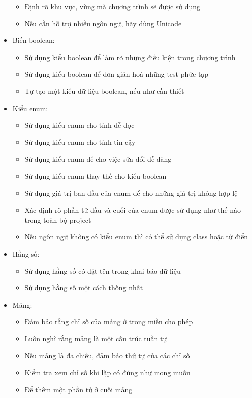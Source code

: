 \documentclass[12pt]{report}
\begin{document}
\begin{itemize}
\begin{itemize}
			\item Định rõ khu vực, vùng mà chương trình sẽ được sử dụng
			\item Nếu cần hỗ trợ nhiều ngôn ngữ, hãy dùng Unicode 
		\end{itemize}
	\item Biến boolean:
		\begin{itemize}
			\item Sử dụng kiểu boolean để làm rõ những điều kiện trong chương trình 
			\item Sử dụng kiểu boolean để đơn giản hoá những test phức tạp
			\item Tự tạo một kiểu dữ liệu boolean, nếu như cần thiết 
		\end{itemize}
	\item Kiểu enum:
		\begin{itemize}
			\item Sử dụng kiểu enum cho tính dễ đọc 
			\item Sử dụng kiểu enum cho tính tin cậy
			\item Sử dụng kiểu enum để cho việc sửa đổi dễ dàng 
			\item Sử dụng kiểu enum thay thế cho kiểu boolean 
			\item Sử dụng giá trị ban đầu của enum để cho những giá trị không hợp lệ
			\item Xác định rõ phần tử đầu và cuối của enum được sử dụng như thế nào trong toàn bộ project 
			\item Nếu ngôn ngữ không có kiểu enum thì có thể sử dụng class hoặc từ điển  
		\end{itemize}
	\item Hằng số:
		\begin{itemize}
			\item Sử dụng hằng số có đặt tên trong khai báo dữ liệu 
			\item Sử dụng hằng số một cách thống nhất 
		\end{itemize}
	\item Mảng:
		\begin{itemize}
			\item Đảm bảo rằng chỉ số của mảng ở trong miền cho phép 
			\item Luôn nghĩ rằng mảng là một cấu trúc tuần tự 
			\item Nếu mảng là đa chiều, đảm bảo thứ tự của các chỉ số 
			\item Kiểm tra xem chỉ số khi lặp có đúng như mong muốn 
			\item Để thêm một phần tử ở cuối mảng 
		\end{itemize}
\end{itemize}
\end{document}
